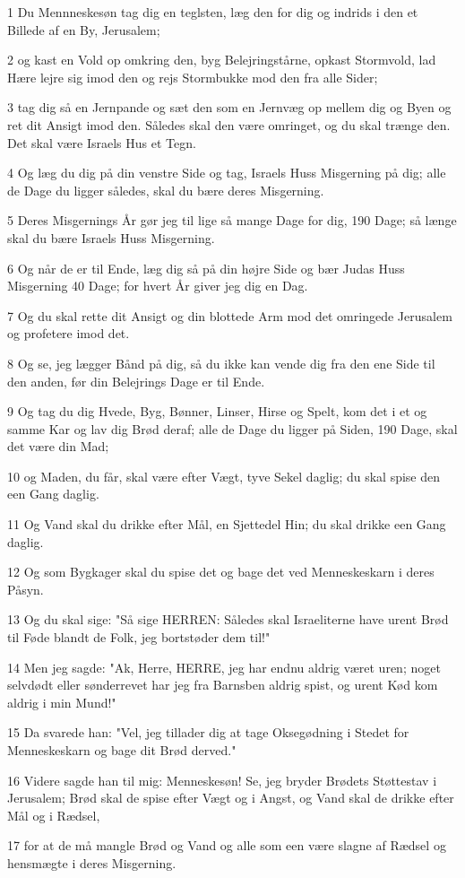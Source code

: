 \par 1 Du Mennneskesøn tag dig en teglsten, læg den for dig og indrids i den et Billede af en By, Jerusalem;
\par 2 og kast en Vold op omkring den, byg Belejringstårne, opkast Stormvold, lad Hære lejre sig imod den og rejs Stormbukke mod den fra alle Sider;
\par 3 tag dig så en Jernpande og sæt den som en Jernvæg op mellem dig og Byen og ret dit Ansigt imod den. Således skal den være omringet, og du skal trænge den. Det skal være Israels Hus et Tegn.
\par 4 Og læg du dig på din venstre Side og tag, Israels Huss Misgerning på dig; alle de Dage du ligger således, skal du bære deres Misgerning.
\par 5 Deres Misgernings År gør jeg til lige så mange Dage for dig, 190 Dage; så længe skal du bære Israels Huss Misgerning.
\par 6 Og når de er til Ende, læg dig så på din højre Side og bær Judas Huss Misgerning 40 Dage; for hvert År giver jeg dig en Dag.
\par 7 Og du skal rette dit Ansigt og din blottede Arm mod det omringede Jerusalem og profetere imod det.
\par 8 Og se, jeg lægger Bånd på dig, så du ikke kan vende dig fra den ene Side til den anden, før din Belejrings Dage er til Ende.
\par 9 Og tag du dig Hvede, Byg, Bønner, Linser, Hirse og Spelt, kom det i et og samme Kar og lav dig Brød deraf; alle de Dage du ligger på Siden, 190 Dage, skal det være din Mad;
\par 10 og Maden, du får, skal være efter Vægt, tyve Sekel daglig; du skal spise den een Gang daglig.
\par 11 Og Vand skal du drikke efter Mål, en Sjettedel Hin; du skal drikke een Gang daglig.
\par 12 Og som Bygkager skal du spise det og bage det ved Menneskeskarn i deres Påsyn.
\par 13 Og du skal sige: "Så sige HERREN: Således skal Israeliterne have urent Brød til Føde blandt de Folk, jeg bortstøder dem til!"
\par 14 Men jeg sagde: "Ak, Herre, HERRE, jeg har endnu aldrig været uren; noget selvdødt eller sønderrevet har jeg fra Barnsben aldrig spist, og urent Kød kom aldrig i min Mund!"
\par 15 Da svarede han: "Vel, jeg tillader dig at tage Oksegødning i Stedet for Menneskeskarn og bage dit Brød derved."
\par 16 Videre sagde han til mig: Menneskesøn! Se, jeg bryder Brødets Støttestav i Jerusalem; Brød skal de spise efter Vægt og i Angst, og Vand skal de drikke efter Mål og i Rædsel,
\par 17 for at de må mangle Brød og Vand og alle som een være slagne af Rædsel og hensmægte i deres Misgerning.

